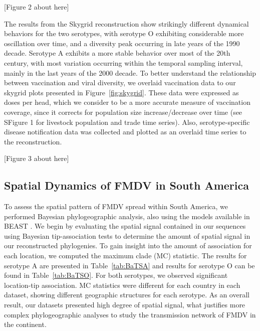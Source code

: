 \documentclass[10pt]{article}
\begin{document}
\begin{center}
 [Figure 2 about here]
\end{center}

The results from the Skygrid reconstruction show strikingly different dynamical behaviors for the two serotypes, with serotype O exhibiting considerable more oscillation over time, and a diversity peak occurring in late years of the 1990 decade.
Serotype A exhibits a more stable behavior over most of the 20th century, with most variation occurring within the temporal sampling interval, mainly in the last years of the 2000 decade.
To better understand the relationship between vaccination and viral diversity, we overlaid vaccination data to our skygrid plots presented in Figure~\ref{fig:skygrid}.
These data were expressed as doses per head, which we consider to be a more accurate measure of vaccination coverage, since it corrects for population size increase/decrease over time (see SFigure 1 for livestock population and trade time series).
Also, serotype-specific disease notification data was collected and plotted as an overlaid time series to the reconstruction. 

\begin{center}
 [Figure 3 about here]
\end{center}

\subsection*{Spatial Dynamics of FMDV in South America}

To assess the spatial pattern of FMDV spread within South America, we performed Bayesian phylogeographic analysis, also using the models available in BEAST \cite{roots}.
We begin by evaluating the spatial signal contained in our sequences using Bayesian tip-association tests \cite{bats} to determine the amount of spatial signal in our reconstructed phylogenies.
To gain insight into the amount of association for each location, we computed the maximum clade (MC) statistic.
The results for serotype A are presented in Table~\ref{tab:BaTSA} and results for serotype O can be found in Table~\ref{tab:BaTSO}.
For both serotypes, we observed significant location-tip association.
MC statistics were different for each country in each dataset, showing different geographic structures for each serotype.
As an overall result, our datasets presented high degree of spatial signal, what justifies more complex phylogeographic analyses to study the transmission network of FMDV in the continent.
\end{document}
